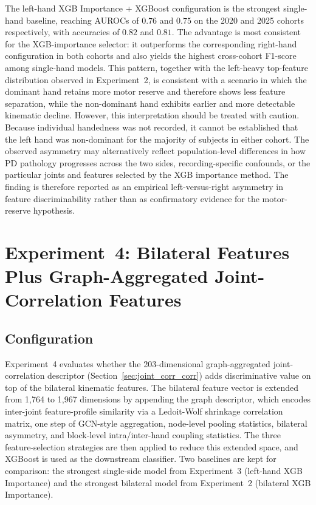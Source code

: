 The left-hand XGB Importance + XGBoost configuration is the strongest single-hand baseline, reaching AUROCs of $0.76$ and $0.75$ on the 2020 and 2025 cohorts respectively, with accuracies of $0.82$ and $0.81$. The advantage is most consistent for the XGB-importance selector: it outperforms the corresponding right-hand configuration in both cohorts and also yields the highest cross-cohort F1-score among single-hand models. This pattern, together with the left-heavy top-feature distribution observed in Experiment~2, is consistent with a scenario in which the dominant hand retains more motor reserve and therefore shows less feature separation, while the non-dominant hand exhibits earlier and more detectable kinematic decline. However, this interpretation should be treated with caution. Because individual handedness was not recorded, it cannot be established that the left hand was non-dominant for the majority of subjects in either cohort. The observed asymmetry may alternatively reflect population-level differences in how PD pathology progresses across the two sides, recording-specific confounds, or the particular joints and features selected by the XGB importance method. The finding is therefore reported as an empirical left-versus-right asymmetry in feature discriminability rather than as confirmatory evidence for the motor-reserve hypothesis.

\section{Experiment~4: Bilateral Features Plus Graph-Aggregated Joint-Correlation Features}
\label{sec:exp4}

\subsection{Configuration}

Experiment~4 evaluates whether the 203-dimensional graph-aggregated joint-correlation descriptor (Section~\ref{sec:joint_corr_corr}) adds discriminative value on top of the bilateral kinematic features. The bilateral feature vector is extended from 1,764 to 1,967 dimensions by appending the graph descriptor, which encodes inter-joint feature-profile similarity via a Ledoit-Wolf shrinkage correlation matrix, one step of GCN-style aggregation, node-level pooling statistics, bilateral asymmetry, and block-level intra/inter-hand coupling statistics. The three feature-selection strategies are then applied to reduce this extended space, and XGBoost is used as the downstream classifier. Two baselines are kept for comparison: the strongest single-side model from Experiment~3 (left-hand XGB Importance) and the strongest bilateral model from Experiment~2 (bilateral XGB Importance).


